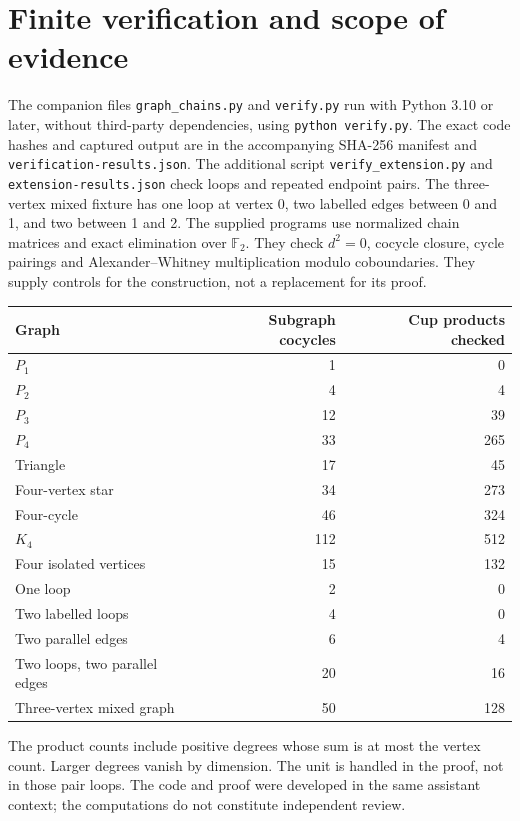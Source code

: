 \documentclass[11pt,a4paper]{article}
\newcommand{\F}{\mathbb F_2}
\begin{document}
\section{Finite verification and scope of evidence}
The companion files \texttt{graph\_chains.py} and \texttt{verify.py} run with
Python 3.10 or later, without third-party dependencies, using
\texttt{python verify.py}. The exact code hashes and captured output are in
the accompanying SHA-256 manifest and \texttt{verification-results.json}.
The additional script \texttt{verify\_extension.py} and
\texttt{extension-results.json} check loops and repeated endpoint pairs.
The three-vertex mixed fixture has one loop at vertex 0, two labelled edges
between 0 and 1, and two between 1 and 2.
The supplied programs use normalized chain matrices and exact elimination over
$\F$. They check $d^2=0$, cocycle closure, cycle pairings and
Alexander--Whitney multiplication modulo coboundaries. They supply controls
for the construction, not a replacement for its proof.
\begin{center}
\begin{tabular}{lrr}
\toprule
Graph & Subgraph cocycles & Cup products checked\\
\midrule
$P_1$ & 1 & 0\\
$P_2$ & 4 & 4\\
$P_3$ & 12 & 39\\
$P_4$ & 33 & 265\\
Triangle & 17 & 45\\
Four-vertex star & 34 & 273\\
Four-cycle & 46 & 324\\
$K_4$ & 112 & 512\\
Four isolated vertices & 15 & 132\\
One loop & 2 & 0\\
Two labelled loops & 4 & 0\\
Two parallel edges & 6 & 4\\
Two loops, two parallel edges & 20 & 16\\
Three-vertex mixed graph & 50 & 128\\
\bottomrule
\end{tabular}
\end{center}
The product counts include positive degrees whose sum is at most the vertex
count. Larger degrees vanish by dimension. The unit is handled in the proof,
not in those pair loops. The code and proof were developed in the same
assistant context; the computations do not constitute independent review.
\end{document}
